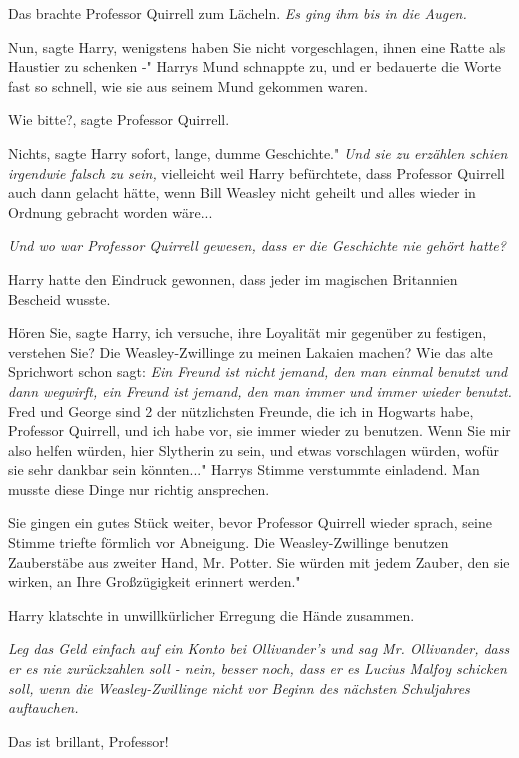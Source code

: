 Das brachte Professor Quirrell zum Lächeln.\emph{ Es ging ihm bis in die Augen.}

\glqq Nun\grqq{}, sagte Harry, \glqq wenigstens haben Sie nicht vorgeschlagen,
ihnen eine Ratte als Haustier zu schenken -" Harrys Mund schnappte zu, und er
bedauerte die Worte fast so schnell, wie sie aus seinem Mund gekommen waren.

\glqq Wie bitte?\grqq{}, sagte Professor Quirrell.

\glqq Nichts\grqq{}, sagte Harry sofort, \glqq lange, dumme Geschichte."
\emph{Und sie zu erzählen schien irgendwie falsch zu sein, }vielleicht weil
Harry befürchtete, dass Professor Quirrell auch dann gelacht hätte, wenn Bill
Weasley nicht geheilt und alles wieder in Ordnung gebracht worden wäre...

\emph{Und wo war Professor Quirrell gewesen, dass er die Geschichte nie gehört
hatte?}

Harry hatte den Eindruck gewonnen, dass jeder im magischen Britannien Bescheid
wusste.

\glqq Hören Sie\grqq{}, sagte Harry, \glqq ich versuche, ihre Loyalität mir
gegenüber zu festigen, verstehen Sie? Die Weasley-Zwillinge zu meinen Lakaien
machen? Wie das alte Sprichwort schon sagt: \emph{Ein Freund ist nicht jemand,
den man einmal benutzt und dann wegwirft, ein Freund ist jemand, den man immer
und immer wieder benutzt.} Fred und George sind 2 der nützlichsten Freunde, die
ich in Hogwarts habe, Professor Quirrell, und ich habe vor, sie immer wieder zu
benutzen. Wenn Sie mir also helfen würden, hier Slytherin zu sein, und etwas
vorschlagen würden, wofür sie sehr dankbar sein könnten..." Harrys Stimme
verstummte einladend. Man musste diese Dinge nur richtig ansprechen.

Sie gingen ein gutes Stück weiter, bevor Professor Quirrell wieder sprach, seine
Stimme triefte förmlich vor Abneigung. \glqq Die Weasley-Zwillinge benutzen
Zauberstäbe aus zweiter Hand, Mr. Potter. Sie würden mit jedem Zauber, den sie
wirken, an Ihre Großzügigkeit erinnert werden."

Harry klatschte in unwillkürlicher Erregung die Hände zusammen.

\emph{Leg das Geld einfach auf ein Konto bei Ollivander's und sag Mr.
Ollivander, dass er es nie zurückzahlen soll - nein, besser noch, dass er es
Lucius Malfoy schicken soll, wenn die Weasley-Zwillinge nicht vor Beginn des
nächsten Schuljahres auftauchen.}

\glqq Das ist brillant, Professor!\grqq{}

